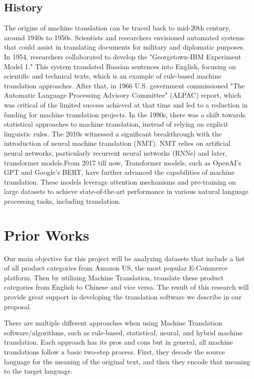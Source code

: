 \documentclass[sigconf]{acmart}
\begin{document}
    \subsection{History} 
    The origins of machine translation can be traced back to mid-20th century, around 1940s to 1950s. Scientists and researchers envisioned automated systems that could assist in translating documents for military and diplomatic purposes. In 1954, researchers collaborated to develop the "Georgetown-IBM Experiment Model 1." This system translated Russian sentences into English, focusing on scientific and technical texts, which is an example of rule-based machine translation approaches. After that, in 1966 U.S. government commissioned "The Automatic Language Processing Advisory Committee" (ALPAC) report, which was critical of the limited success achieved at that time and led to a reduction in funding for machine translation projects. In the 1990s, there was a shift towards statistical approaches to machine translation, instead of relying on explicit linguistic rules. The 2010s witnessed a significant breakthrough with the introduction of neural machine translation (NMT). NMT relies on artificial neural networks, particularly recurrent neural networks (RNNs) and later, transformer models.From 2017 till now, Transformer models, such as OpenAI's GPT and Google's BERT, have further advanced the capabilities of machine translation. These models leverage attention mechanisms and pre-training on large datasets to achieve state-of-the-art performance in various natural language processing tasks, including translation.

\section{Prior Works}
    Our main objective for this project will be analyzing datasets that include a list of all product categories from Amazon US, the most popular E-Commerce platform. Then by utilizing Machine Translation, translate these product categories from English to Chinese and vice versa. The result of this research will provide great support in developing the translation software we describe in our proposal.
    
    There are multiple different approaches when using Machine Translation software/algorithms, such as rule-based, statistical, neural, and hybrid machine translation. Each approach has its pros and cons but in general, all machine translations follow a basic two-step process. First, they decode the source language for the meaning of the original text, and then they encode that meaning to the target language\cite{Amazon_MT}.
\end{document}
